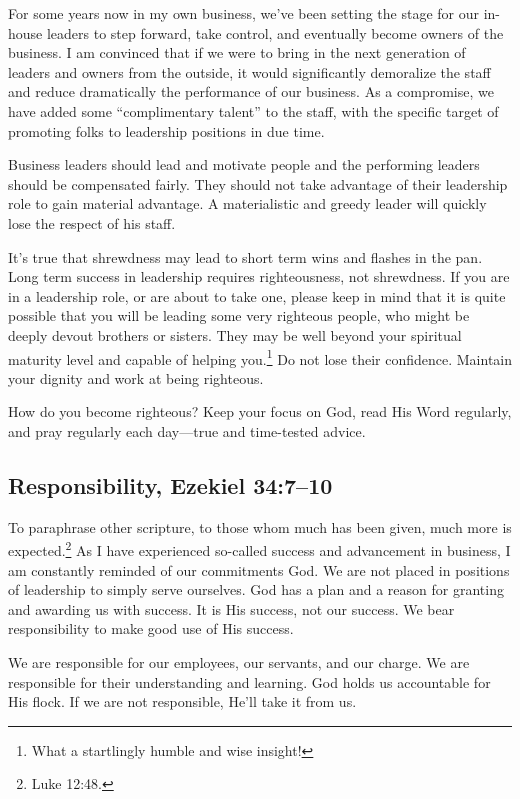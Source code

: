 \documentclass[12pt]{memoir}
\begin{document}
For some years now in my own business, we've been setting the stage for our in-house leaders to step forward, take control, and eventually become owners of the business. I am convinced that if we were to bring in the next generation of leaders and owners from the outside, it would significantly demoralize the staff and reduce dramatically the performance of our business. As a compromise, we have added some ``complimentary talent'' to the staff, with the specific target of promoting folks to leadership positions in due time.

Business leaders should lead and motivate people and the performing leaders should be compensated fairly. They should not take advantage of their leadership role to gain material advantage. A materialistic and greedy leader will quickly lose the respect of his staff. 

It's true that shrewdness may lead to short term wins and flashes in the pan. Long term success in leadership requires righteousness, not shrewdness. If you are in a leadership role, or are about to take one, please keep in mind that it is quite possible that you will be leading some
very righteous people, who might be deeply devout brothers or sisters.
They may be well beyond your spiritual maturity level and capable
of helping you.\footnote{What a startlingly humble and wise insight!}  Do not lose their confidence. Maintain your dignity and work at being righteous.

How do you become righteous? Keep your focus on God, read His Word regularly, and pray regularly each day---true and time-tested advice.

\subsection[Responsibility]{Responsibility, Ezekiel 34:7--10}

To paraphrase other scripture, to those whom much has been given,
much more is expected.\footnote{Luke 12:48.} As I have experienced so-called success
and advancement in business, I am constantly reminded of our commitments
God. We are not placed in positions of leadership to simply
serve ourselves. God has a plan and a reason for granting and awarding
us with success. It is His success, not our success. We bear responsibility to make good use of His success.

We are responsible for our employees, our servants, and our charge. We are responsible for their understanding and learning. God holds us accountable for His flock. If we are not responsible, He'll take it from us.
\end{document}
